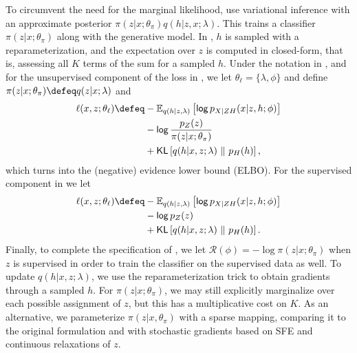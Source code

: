 To circumvent the need for the marginal likelihood,
\citet{KingmaEtAl2014SSVAE} use variational inference
\citep{Jordan+1999:VI} with an approximate posterior $\pi(z|x;
    \theta_\pi)q(h|z,x; \lambda)$. This trains a classifier $\pi(z|x;
    \theta_\pi)$ along with the generative model. In
\citet{KingmaEtAl2014SSVAE}, $h$ is sampled with a
reparameterization, and the expectation over $z$ is computed in
closed-form, that is, assessing all $K$ terms of the sum for a
sampled $h$. Under the notation in , and for the
unsupervised component of the loss in , we let
$\theta_\ell = \{\lambda, \phi\}$ and define $\pi(z|x; \theta_\pi)
    \defeq q(z|x; \lambda)$ and
%
\begin{align}
    \begin{split}
        \ell(x, z; \theta_\ell) \defeq
        & - \mathbb E_{q(h|z,  \lambda)}\left[ \log p_{X|ZH}(x |z, h; \phi) \right] \\
        & - \log \frac{p_Z(z)}{\pi(z |x; \theta_\pi)}                          \\
        & + \KL\left[q(h |x, z; \lambda) \,\,\|\,\, p_H(h)\right],
        \label{eq:elbonotation}
    \end{split}
\end{align}
%
which turns  into the (negative) evidence lower bound
(ELBO). For the supervised component in  we let
%
\begin{align}
    \begin{split}
        \ell(x, z; \theta_\ell) \defeq
        & - \mathbb E_{q(h|z,  \lambda)}\left[ \log p_{X|ZH}(x |z, h; \phi) \right] \\
        & - \log p_Z(z)                          \\
        & + \KL\left[q(h |x, z; \lambda) \,\,\|\,\, p_H(h)\right].
        \label{eq:elbosupervised}
    \end{split}
\end{align}
%
Finally, to complete the specification of ,
we let $\mathcal R(\phi) = - \log \pi(z |x; \theta_\pi)$ when $z$ is supervised
in order to train the classifier on the supervised data as well.
To update $q(h | x, z; \lambda)$, we use the
reparameterization trick to obtain gradients through a sampled $h$.
For $\pi(z | x; \theta_\pi)$, we may still explicitly marginalize over
each possible assignment of $z$, but this has a multiplicative cost
on $K$. As an alternative, we parameterize $\pi(z|x,
    \theta_\pi)$ with a sparse mapping, comparing it to the original
formulation and with stochastic gradients based on SFE and continuous
relaxations of $z$.

